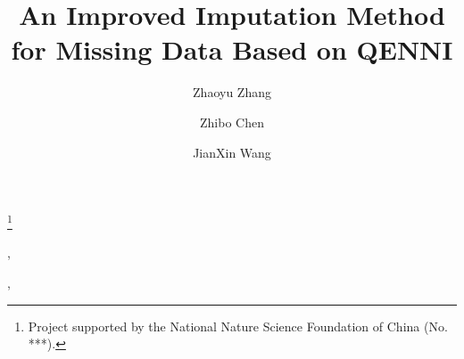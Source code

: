 \documentclass[print]{jicspack}
\begin{document}
\begin{premaker}


\title{An Improved Imputation Method for Missing Data Based on QENNI }
\thanks[label1]{Project supported by the National Nature Science Foundation of China (No. ***).}
\author[author1]{Zhaoyu Zhang},
\author[author2]{Zhibo Chen},
\author[author3]{JianXin Wang}

\address[author1]{School of Information Science And Technology, Beijing Forestry University, Beijing 100083, China}
\address[author2]{School of Information Science And Technology, Beijing Forestry University, Beijing 100083, China}
\address[author3]{School of Information Science And Technology, Beijing Forestry University, Beijing 100083, China}


\end{premaker}
\end{document}
